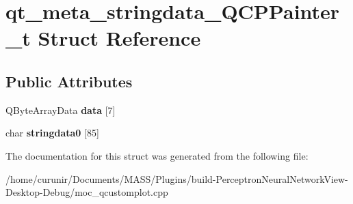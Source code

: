 \hypertarget{structqt__meta__stringdata___q_c_p_painter__t}{}\section{qt\+\_\+meta\+\_\+stringdata\+\_\+\+Q\+C\+P\+Painter\+\_\+t Struct Reference}
\label{structqt__meta__stringdata___q_c_p_painter__t}
\subsection*{Public Attributes}
\begin{DoxyCompactItemize}
\item 
Q\+Byte\+Array\+Data {\bfseries data} \mbox{[}7\mbox{]}\hypertarget{structqt__meta__stringdata___q_c_p_painter__t_ad207c5d12c2c25b489d92c783a387865}{}\label{structqt__meta__stringdata___q_c_p_painter__t_ad207c5d12c2c25b489d92c783a387865}

\item 
char {\bfseries stringdata0} \mbox{[}85\mbox{]}\hypertarget{structqt__meta__stringdata___q_c_p_painter__t_a5a729fecff22f5c3258902008085a51f}{}\label{structqt__meta__stringdata___q_c_p_painter__t_a5a729fecff22f5c3258902008085a51f}

\end{DoxyCompactItemize}


The documentation for this struct was generated from the following file\+:\begin{DoxyCompactItemize}
\item 
/home/curunir/\+Documents/\+M\+A\+S\+S/\+Plugins/build-\/\+Perceptron\+Neural\+Network\+View-\/\+Desktop-\/\+Debug/moc\+\_\+qcustomplot.\+cpp\end{DoxyCompactItemize}
